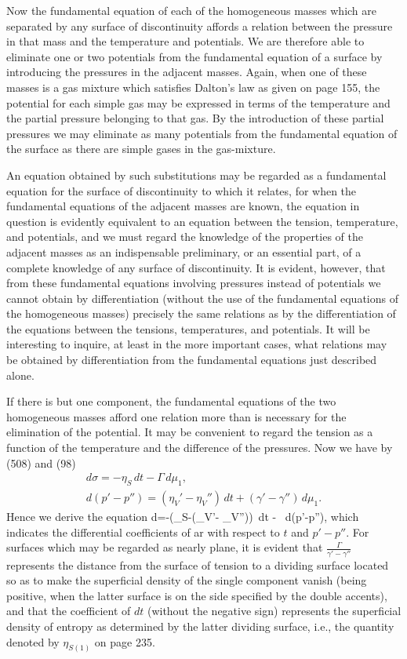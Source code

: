 \documentclass[12pt]{article}
\begin{document}
{Now the fundamental equation of each of the homogeneous masses which are separated by any surface of discontinuity affords a relation between the pressure in that mass and the temperature and potentials. We are therefore able to eliminate one or two potentials from the fundamental equation of a surface by introducing the pressures in the adjacent masses. Again, when one of these masses is a gas mixture which satisfies Dalton's law as given on page 155, the potential for each simple gas may be expressed in terms of the temperature and the partial pressure belonging to that gas. By the introduction of these partial pressures we may eliminate as many potentials from the fundamental equation of the surface as there are simple gases in the gas-mixture.

An equation obtained by such substitutions may be regarded as a fundamental equation for the surface of discontinuity to which it relates, for when the fundamental equations of the adjacent masses are known, the equation in question is evidently equivalent to an equation between the tension, temperature, and potentials, and we must regard the knowledge of the properties of the adjacent masses as an indispensable preliminary, or an essential part, of a complete knowledge of any surface of discontinuity. It is evident, however, that from these fundamental equations involving pressures instead of potentials we cannot obtain by differentiation (without the use of the fundamental equations of the homogeneous masses) precisely the same relations as by the differentiation of the equations between the tensions, temperatures, and potentials.  It will be interesting to inquire, at least in the more important cases, what relations may be obtained by differentiation from  the fundamental equations just described alone.

If there is but one component, the fundamental equations of the two homogeneous masses afford one relation more than is necessary for the elimination of the potential. It may be convenient to regard the tension as a function of the temperature and the difference of the pressures. Now we have by (508) and (98)
\begin{gather*}d\sigma = - \eta_S \, dt- \Gamma\, d\mu_1, \\
d(p'-p'')= (\eta_V'- \eta_V'')\, dt +(\gamma'- \gamma'')\, d\mu_1. \end{gather*}
Hence we derive the equation
\eqs d\sigma =-\left(\eta_S-(\eta_V'- \eta_V'')\right) \,dt -  \, d(p'-p''), \label{578} \eqe
which indicates the differential coefficients of ar with respect to $t$ and $p' -p''$. For surfaces which may be regarded as nearly plane, it is
evident that $\frac{\Gamma}{\gamma'-\gamma''}$ represents the distance from the surface of tension to a dividing surface located so as to make the superficial density of the single component vanish (being positive, when the latter surface is on the side specified by the double accents), and that the coefficient of $dt$ (without the negative sign) represents the superficial density of entropy as determined by the latter dividing surface, i.e., the quantity denoted by $\eta_{S(1)}$ on page 235.

}
\end{document}
